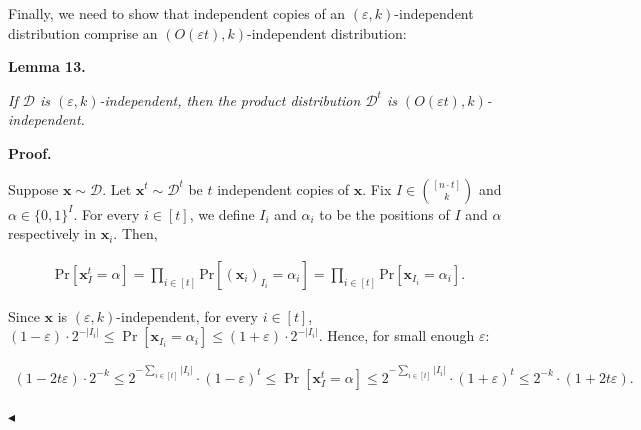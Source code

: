 Finally, we need to show that independent copies of an $(\varepsilon,k)$-independent distribution comprise an $(O(\varepsilon t),k)$-independent distribution:\par





\par\medskip\noindent\textbf{
\textbf{Lemma 13}\textbf{.}
}\par



\emph{If $\mathcal{D}$ is $(\varepsilon,k)$-independent, then the product distribution $\mathcal{D}^{t}$ is $(O(\varepsilon t),k)$-independent.}\par







\par\medskip\noindent\textbf{Proof.}\par




Suppose $\bm{x}\sim\mathcal{D}$. Let $\bm{x}^{t}\sim\mathcal{D}^{t}$ be $t$ independent copies of $\bm{x}$. Fix $I\in\binom{[n\cdot t]}{k}$ and $\alpha\in\{0,1\}^{I}$. For every $i\in[t]$, we define $I_{i}$ and $\alpha_{i}$ to be the positions of $I$ and $\alpha$ respectively in $\bm{x}_{i}$. Then,\par


\[\begin{gathered}
\mathrm{Pr}[\bm{x}^{t}_{I}=\alpha]=\prod_{i\in[t]}\mathrm{Pr}[(\bm{x}_{i})_{I_{i}}=\alpha_{i}]=\prod_{i\in[t]}\mathrm{Pr}[\bm{x}_{I_{i}}=\alpha_{i}].
\end{gathered}\]


Since $\bm{x}$ is $(\varepsilon,k)$-independent, for every $i\in[t]$,
$(1-\varepsilon)\cdot 2^{-|I_{i}|}\leq\Pr[\bm{x}_{I_{i}}=\alpha_{i}]\leq(1+\varepsilon)\cdot 2^{-|I_{i}|}$. Hence, for small enough $\varepsilon$:\par


\[\begin{gathered}
(1-2t\varepsilon)\cdot 2^{-k}\leq 2^{-\sum_{i\in[t]}|I_{i}|}\cdot(1-\varepsilon)^{t}\leq\Pr[\bm{x}^{t}_{I}=\alpha]\leq 2^{-\sum_{i\in[t]}|I_{i}|}\cdot(1+\varepsilon)^{t}\leq 2^{-k}\cdot(1+2t\varepsilon).\
\end{gathered}\]


$\blacktriangleleft$\par





